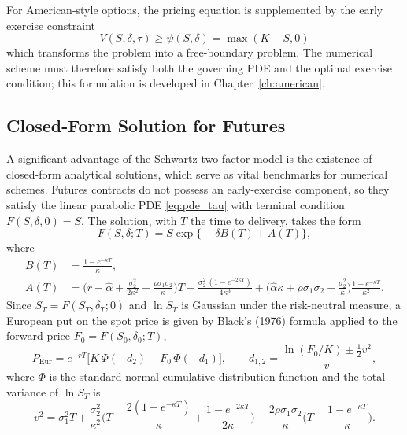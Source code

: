 \documentclass[12pt,a4paper]{article}
\begin{document}
For American-style options, the pricing equation is supplemented by the early exercise constraint
\begin{equation}\label{eq:obstacle}
    V(S,\delta,\tau)\geq \psi(S,\delta)=\max(K-S,0)
\end{equation}
which transforms the problem into a free-boundary problem. The numerical scheme must therefore satisfy both the governing PDE and the optimal exercise condition; this formulation is developed in Chapter~\ref{ch:american}.

\subsection{Closed-Form Solution for Futures}\label{sec:closedform}
A significant advantage of the Schwartz two-factor model is the existence of closed-form analytical solutions, which serve as vital benchmarks for numerical schemes. Futures contracts do not possess an early-exercise component, so they satisfy the linear parabolic PDE \eqref{eq:pde_tau} with terminal condition $F(S,\delta,0)=S$. The solution, with $T$ the time to delivery, takes the form
\begin{equation}\label{eq:futures}
F(S,\delta;T)=S\exp\!\big\{-\delta B(T)+A(T)\big\},
\end{equation}
where
\begin{align}
B(T)&=\frac{1-e^{-\kappa T}}{\kappa},\\
A(T)&=\Big(r-\hat\alpha+\frac{\sigma_2^2}{2\kappa^2}-\frac{\rho\sigma_1\sigma_2}{\kappa}\Big)T
+\frac{\sigma_2^2\,(1-e^{-2\kappa T})}{4\kappa^3}
+\Big(\hat\alpha\kappa+\rho\sigma_1\sigma_2-\frac{\sigma_2^2}{\kappa}\Big)\frac{1-e^{-\kappa T}}{\kappa^2}.
\end{align}
Since $S_T=F(S_T,\delta_T;0)$ and $\ln S_T$ is Gaussian under the risk-neutral measure, a European put on the spot price is given by Black's (1976) formula applied to the forward price $F_0=F(S_0,\delta_0;T)$,
\begin{equation}\label{eq:euro}
P_{\mathrm{Eur}}=e^{-rT}\big[K\,\Phi(-d_2)-F_0\,\Phi(-d_1)\big],\qquad d_{1,2}=\frac{\ln(F_0/K)\pm\frac12v^2}{v},
\end{equation}
where $\Phi$ is the standard normal cumulative distribution function and the total variance of $\ln S_T$ is
\begin{equation}\label{eq:var}
v^2=\sigma_1^2T+\frac{\sigma_2^2}{\kappa^2}\Big(T-\frac{2(1-e^{-\kappa T})}{\kappa}+\frac{1-e^{-2\kappa T}}{2\kappa}\Big)-\frac{2\rho\sigma_1\sigma_2}{\kappa}\Big(T-\frac{1-e^{-\kappa T}}{\kappa}\Big).
\end{equation}
\end{document}
